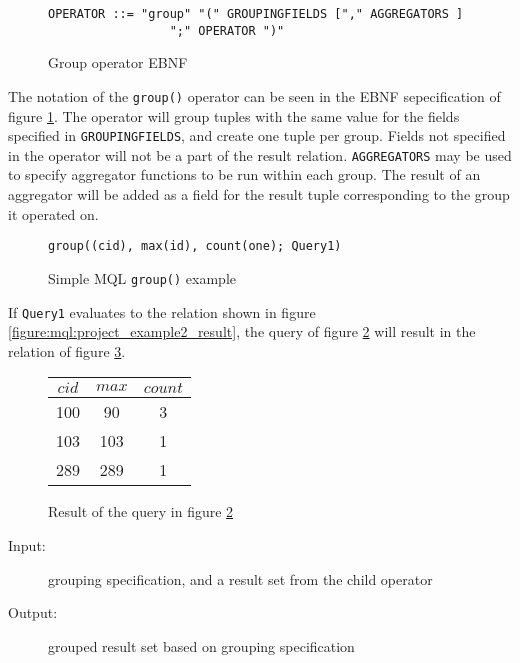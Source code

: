 \begin{figure}[!h]
\begin{Verbatim}
OPERATOR ::= "group" "(" GROUPINGFIELDS ["," AGGREGATORS ] 
                 ";" OPERATOR ")"
\end{Verbatim}
\label{figure:mql:groupEBNF}
\caption{Group operator EBNF}
\end{figure}

The notation of the \texttt{group()} operator can be seen in the EBNF sepecification of figure
\ref{figure:mql:groupEBNF}. The operator will group tuples with the same value for the fields specified in
\texttt{GROUPINGFIELDS}, and create one tuple per group. Fields not specified in the operator will not be a part
of the result relation. \texttt{AGGREGATORS} may be used to specify aggregator functions to be run within each
group. The result of an aggregator will be added as a field for the result tuple corresponding to the group it
operated on.

\begin{figure}[!h]
\begin{Verbatim}
group((cid), max(id), count(one); Query1)
\end{Verbatim}
\caption{Simple MQL \texttt{group()} example}
\label{figure:mql:groupEx}
\end{figure}

If \texttt{Query1} evaluates to the relation shown in figure \ref{figure:mql:project_example2_result}, the query
of figure \ref{figure:mql:groupEx} will result in the relation of figure \ref{figure:mql:groupres}.

\begin{figure}[!h]
\centering
\begin{tabular}{|c|c|c|} \hline
$cid$ & $max$ & $count$ \\ \hline
100 & 90 & 3 \\ \hline
103 & 103 & 1 \\ \hline
289 & 289 & 1 \\ \hline
\end{tabular}
\caption{Result of the query in figure \ref{figure:mql:groupEx}}
\label{figure:mql:groupres}
\end{figure}

\begin{description}
  \item[Input:] grouping specification, and a result set from the child operator
  \item[Output:] grouped result set based on grouping specification
\end{description}


